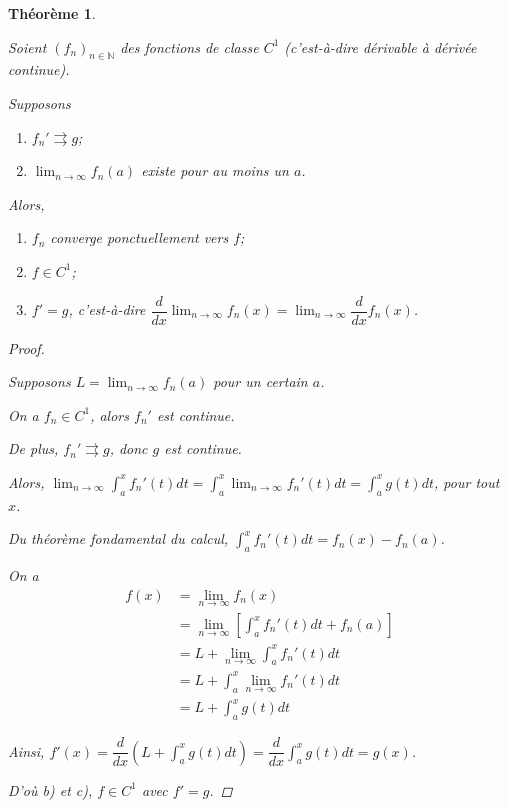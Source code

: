 \documentclass{report}
\newcommand*{\dlim}[3]{\displaystyle\lim_{#1 \to #2}#3}
\newcommand*{\dint}[3]{\displaystyle\int_{#1}^{#2}#3}
\newcommand*{\convuni}{\rightrightarrows}
\newcommand*{\naturels}{\mathbb{N}}
\newtheorem*{thm}{Th\'eor\`eme}
\theoremstyle{definition}
\theoremstyle{remark}
\begin{document}
	\begin{thm}~

		Soient $(f_n)_{n \in \naturels}$ des fonctions de classe $C^1$ (c'est-\`a-dire d\'erivable \`a d\'eriv\'ee continue).

		Supposons
		\begin{enumerate}[label=\roman*)]
			\item $f_n' \convuni g$;
			\item $\dlim{n}{\infty}{f_n(a)}$ existe pour au moins un $a$.
		\end{enumerate}

		Alors,
		\begin{enumerate}[label=\alph*)]
			\item $f_n$ converge ponctuellement vers $f$;
			\item $f \in C^1$;
			\item $f'=g$, c'est-\`a-dire $\dfrac{d}{dx}\dlim{n}{\infty}{f_n(x)} = \dlim{n}{\infty}{\dfrac{d}{dx}f_n(x)}$.
		\end{enumerate}
		\begin{proof}~

			Supposons $L = \dlim{n}{\infty}{f_n(a)}$ pour un certain $a$.

			On a $f_n \in C^1$, alors $f_n'$ est continue.

			De plus, $f_n' \convuni g$, donc $g$ est continue.

			Alors, $\dlim{n}{\infty}{\dint{a}{x}{f_n'(t)dt}} = \dint{a}{x}{\dlim{n}{\infty}{f_n'(t)}dt} = \dint{a}{x}{g(t)dt}$, pour tout $x$.

			Du th\'eor\`eme fondamental du calcul, $\dint{a}{x}{f_n'(t)dt} = f_n(x)-f_n(a)$.

			On a
			\begin{align*}
				f(x)&= \dlim{n}{\infty}{f_n(x)}\\
				&= \dlim{n}{\infty}{\left[ \dint{a}{x}{f_n'(t)dt} + f_n(a) \right]}\\
				&= L + \dlim{n}{\infty}{\dint{a}{x}{f_n'(t)dt}}\\
				&= L + \dint{a}{x}{\dlim{n}{\infty}{f_n'(t)}dt}\\
				&= L + \dint{a}{x}{g(t)dt}
			\end{align*}

			Ainsi, $f'(x) = \dfrac{d}{dx}\left( L + \dint{a}{x}{g(t)dt} \right) = \dfrac{d}{dx}\dint{a}{x}{g(t)dt} = g(x)$.

			D'o\`u b) et c), $f \in C^1$ avec $f'=g$.
		\end{proof}
	\end{thm}
\end{document}
